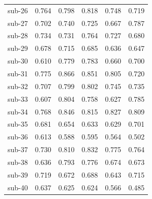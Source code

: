\begin{table}[t]
\begin{tabular}{lccccc}
sub-26 & 0.764 & 0.798 & 0.818 & 0.748 & 0.719 \\
sub-27 & 0.702 & 0.740 & 0.725 & 0.667 & 0.787 \\
sub-28 & 0.734 & 0.731 & 0.764 & 0.727 & 0.680 \\
sub-29 & 0.678 & 0.715 & 0.685 & 0.636 & 0.647 \\
sub-30 & 0.610 & 0.779 & 0.783 & 0.660 & 0.700 \\
sub-31 & 0.775 & 0.866 & 0.851 & 0.805 & 0.720 \\
sub-32 & 0.707 & 0.799 & 0.802 & 0.745 & 0.735 \\
sub-33 & 0.607 & 0.804 & 0.758 & 0.627 & 0.785 \\
sub-34 & 0.768 & 0.846 & 0.815 & 0.827 & 0.809 \\
sub-35 & 0.681 & 0.654 & 0.633 & 0.629 & 0.701 \\
sub-36 & 0.613 & 0.588 & 0.595 & 0.564 & 0.502 \\
sub-37 & 0.730 & 0.810 & 0.832 & 0.775 & 0.764 \\
sub-38 & 0.636 & 0.793 & 0.776 & 0.674 & 0.673 \\
sub-39 & 0.719 & 0.672 & 0.688 & 0.643 & 0.715 \\
sub-40 & 0.637 & 0.625 & 0.624 & 0.566 & 0.485 \\
\bottomrule
\end{tabular}
\end{table}

